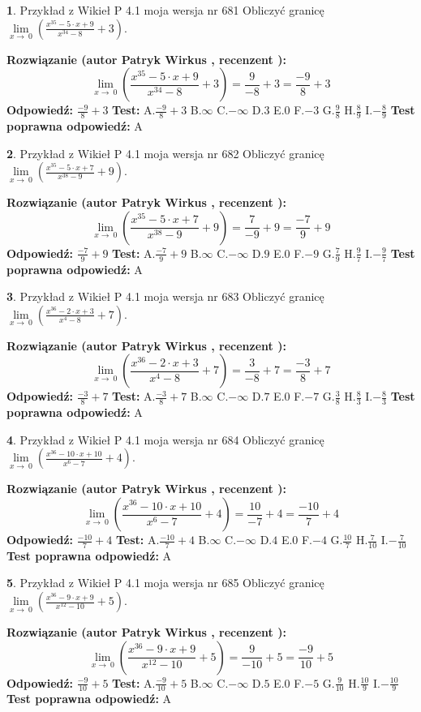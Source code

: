\documentclass[12pt, a4paper]{article}
\theoremstyle{definition} %
\newtheorem{zad}{}
\newcommand{\zadStart}[1]{\begin{zad}#1\newline}
\newcommand{\zadStop}{\end{zad}}
\newcommand{\rozwStart}[2]{\noindent \textbf{Rozwiązanie (autor #1 , recenzent #2): }\newline}
\newcommand{\rozwStop}{\newline}
\newcommand{\odpStart}{\noindent \textbf{Odpowiedź:}\newline}
\newcommand{\odpStop}{\newline}
\newcommand{\testStart}{\noindent \textbf{Test:}\newline}
\newcommand{\testStop}{\newline}
\newcommand{\kluczStart}{\noindent \textbf{Test poprawna odpowiedź:}\newline}
\newcommand{\kluczStop}{\newline}
\begin{document}
\zadStart{Przykład z Wikieł P 4.1 moja wersja nr 681}
Obliczyć granicę $\lim\limits_{x\to\ 0}(\frac{x^{35}-5 \cdot x +9}{x^{34}-8}+3)$.
\zadStop
\rozwStart{Patryk Wirkus}{}
$$\lim\limits_{x\to\ 0}(\frac{x^{35}-5 \cdot x +9}{x^{34}-8}+3)=\frac{9}{-8}+3=\frac{-9}{8}+3$$
\rozwStop
\odpStart
$\frac{-9}{8}+3$
\odpStop
\testStart
A.$\frac{-9}{8}+3$
B.$\infty$
C.$-\infty$
D.$3$
E.$0$
F.$-3$
G.$\frac{9}{8}$
H.$\frac{8}{9}$
I.$-\frac{8}{9}$
\testStop
\kluczStart
A
\kluczStop



\zadStart{Przykład z Wikieł P 4.1 moja wersja nr 682}
Obliczyć granicę $\lim\limits_{x\to\ 0}(\frac{x^{35}-5 \cdot x +7}{x^{38}-9}+9)$.
\zadStop
\rozwStart{Patryk Wirkus}{}
$$\lim\limits_{x\to\ 0}(\frac{x^{35}-5 \cdot x +7}{x^{38}-9}+9)=\frac{7}{-9}+9=\frac{-7}{9}+9$$
\rozwStop
\odpStart
$\frac{-7}{9}+9$
\odpStop
\testStart
A.$\frac{-7}{9}+9$
B.$\infty$
C.$-\infty$
D.$9$
E.$0$
F.$-9$
G.$\frac{7}{9}$
H.$\frac{9}{7}$
I.$-\frac{9}{7}$
\testStop
\kluczStart
A
\kluczStop



\zadStart{Przykład z Wikieł P 4.1 moja wersja nr 683}
Obliczyć granicę $\lim\limits_{x\to\ 0}(\frac{x^{36}-2 \cdot x +3}{x^{4}-8}+7)$.
\zadStop
\rozwStart{Patryk Wirkus}{}
$$\lim\limits_{x\to\ 0}(\frac{x^{36}-2 \cdot x +3}{x^{4}-8}+7)=\frac{3}{-8}+7=\frac{-3}{8}+7$$
\rozwStop
\odpStart
$\frac{-3}{8}+7$
\odpStop
\testStart
A.$\frac{-3}{8}+7$
B.$\infty$
C.$-\infty$
D.$7$
E.$0$
F.$-7$
G.$\frac{3}{8}$
H.$\frac{8}{3}$
I.$-\frac{8}{3}$
\testStop
\kluczStart
A
\kluczStop



\zadStart{Przykład z Wikieł P 4.1 moja wersja nr 684}
Obliczyć granicę $\lim\limits_{x\to\ 0}(\frac{x^{36}-10 \cdot x +10}{x^{6}-7}+4)$.
\zadStop
\rozwStart{Patryk Wirkus}{}
$$\lim\limits_{x\to\ 0}(\frac{x^{36}-10 \cdot x +10}{x^{6}-7}+4)=\frac{10}{-7}+4=\frac{-10}{7}+4$$
\rozwStop
\odpStart
$\frac{-10}{7}+4$
\odpStop
\testStart
A.$\frac{-10}{7}+4$
B.$\infty$
C.$-\infty$
D.$4$
E.$0$
F.$-4$
G.$\frac{10}{7}$
H.$\frac{7}{10}$
I.$-\frac{7}{10}$
\testStop
\kluczStart
A
\kluczStop



\zadStart{Przykład z Wikieł P 4.1 moja wersja nr 685}
Obliczyć granicę $\lim\limits_{x\to\ 0}(\frac{x^{36}-9 \cdot x +9}{x^{12}-10}+5)$.
\zadStop
\rozwStart{Patryk Wirkus}{}
$$\lim\limits_{x\to\ 0}(\frac{x^{36}-9 \cdot x +9}{x^{12}-10}+5)=\frac{9}{-10}+5=\frac{-9}{10}+5$$
\rozwStop
\odpStart
$\frac{-9}{10}+5$
\odpStop
\testStart
A.$\frac{-9}{10}+5$
B.$\infty$
C.$-\infty$
D.$5$
E.$0$
F.$-5$
G.$\frac{9}{10}$
H.$\frac{10}{9}$
I.$-\frac{10}{9}$
\testStop
\kluczStart
A
\kluczStop
\end{document}
